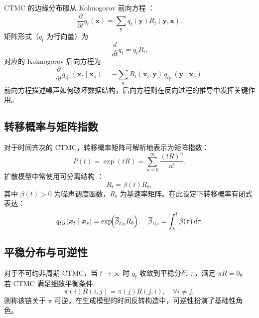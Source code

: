 \documentclass[12pt,a4paper]{ctexbook}
\theoremstyle{definition}
\begin{document}
CTMC 的边缘分布服从 Kolmogorov 前向方程 \cite[Appendix A]{campbell2022ctmc}：
\begin{equation}
\frac{\partial}{\partial t} q_t(\boldsymbol{x}) = \sum_{\boldsymbol{y}} q_t(\boldsymbol{y}) R_t(\boldsymbol{y}, \boldsymbol{x}). \label{eq:kolmogorov-fwd}
\end{equation}
矩阵形式（$q_t$ 为行向量）为
\begin{equation}
\frac{d}{dt} q_t = q_t R_t. \label{eq:kolmogorov-fwd-mat}
\end{equation}
对应的 Kolmogorov 后向方程为
\begin{equation}
\frac{\partial}{\partial t} q_{t|s}(\boldsymbol{x}_t \mid \boldsymbol{x}_s) = -\sum_{\boldsymbol{y}} R_t(\boldsymbol{x}_t, \boldsymbol{y}) \, q_{t|s}(\boldsymbol{y} \mid \boldsymbol{x}_s). \label{eq:kolmogorov-bwd}
\end{equation}
前向方程描述噪声如何破坏数据结构，后向方程则在反向过程的推导中发挥关键作用。

\subsection{转移概率与矩阵指数}

对于时间齐次的 CTMC，转移概率矩阵可解析地表示为矩阵指数：
\begin{equation}
P(t) = \exp(tR) = \sum_{n=0}^{\infty} \frac{(tR)^n}{n!}. \label{eq:matrix-exp}
\end{equation}
扩散模型中常使用可分离结构 \cite[§4.1]{campbell2022ctmc}\cite[§2.1]{zhao2025ud3}：
\begin{equation}
R_t = \beta(t) R_b, \label{eq:separable-rate}
\end{equation}
其中 $\beta(t) > 0$ 为噪声调度函数，$R_b$ 为基速率矩阵。在此设定下转移概率有闭式表达：
\begin{equation}
q_{t|s}(\boldsymbol{x}_t \mid \boldsymbol{x}_s) = \exp\!\Bigl( \overline{\beta}_{t|s} R_b \Bigr), \quad
\overline{\beta}_{t|s} = \int_s^t \beta(\tau)\, d\tau. \label{eq:closed-form-trans}
\end{equation}

\subsection{平稳分布与可逆性}

对于不可约非周期 CTMC，当 $t \to \infty$ 时 $q_t$ 收敛到平稳分布 $\pi$，满足 $\pi R = 0$。
若 CTMC 满足细致平衡条件
\begin{equation}
\pi(i) R(i, j) = \pi(j) R(j, i), \quad \forall i \neq j, \label{eq:detailed-balance}
\end{equation}
则称该链关于 $\pi$ 可逆。在生成模型的时间反转构造中，可逆性扮演了基础性角色。
\end{document}

